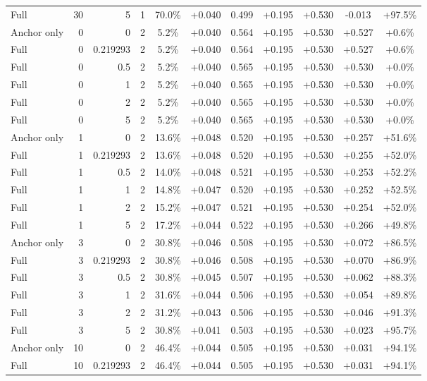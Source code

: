 \begin{table}[htbp]
\begin{tabular}{lrrrccccccc}
Full & 30 & 5 & 1 & 70.0\% & +0.040 & 0.499 & +0.195 & +0.530 & -0.013 & +97.5\% \\
Anchor only & 0 & 0 & 2 & 5.2\% & +0.040 & 0.564 & +0.195 & +0.530 & +0.527 & +0.6\% \\
Full & 0 & 0.219293 & 2 & 5.2\% & +0.040 & 0.564 & +0.195 & +0.530 & +0.527 & +0.6\% \\
Full & 0 & 0.5 & 2 & 5.2\% & +0.040 & 0.565 & +0.195 & +0.530 & +0.530 & +0.0\% \\
Full & 0 & 1 & 2 & 5.2\% & +0.040 & 0.565 & +0.195 & +0.530 & +0.530 & +0.0\% \\
Full & 0 & 2 & 2 & 5.2\% & +0.040 & 0.565 & +0.195 & +0.530 & +0.530 & +0.0\% \\
Full & 0 & 5 & 2 & 5.2\% & +0.040 & 0.565 & +0.195 & +0.530 & +0.530 & +0.0\% \\
Anchor only & 1 & 0 & 2 & 13.6\% & +0.048 & 0.520 & +0.195 & +0.530 & +0.257 & +51.6\% \\
Full & 1 & 0.219293 & 2 & 13.6\% & +0.048 & 0.520 & +0.195 & +0.530 & +0.255 & +52.0\% \\
Full & 1 & 0.5 & 2 & 14.0\% & +0.048 & 0.521 & +0.195 & +0.530 & +0.253 & +52.2\% \\
Full & 1 & 1 & 2 & 14.8\% & +0.047 & 0.520 & +0.195 & +0.530 & +0.252 & +52.5\% \\
Full & 1 & 2 & 2 & 15.2\% & +0.047 & 0.521 & +0.195 & +0.530 & +0.254 & +52.0\% \\
Full & 1 & 5 & 2 & 17.2\% & +0.044 & 0.522 & +0.195 & +0.530 & +0.266 & +49.8\% \\
Anchor only & 3 & 0 & 2 & 30.8\% & +0.046 & 0.508 & +0.195 & +0.530 & +0.072 & +86.5\% \\
Full & 3 & 0.219293 & 2 & 30.8\% & +0.046 & 0.508 & +0.195 & +0.530 & +0.070 & +86.9\% \\
Full & 3 & 0.5 & 2 & 30.8\% & +0.045 & 0.507 & +0.195 & +0.530 & +0.062 & +88.3\% \\
Full & 3 & 1 & 2 & 31.6\% & +0.044 & 0.506 & +0.195 & +0.530 & +0.054 & +89.8\% \\
Full & 3 & 2 & 2 & 31.2\% & +0.043 & 0.506 & +0.195 & +0.530 & +0.046 & +91.3\% \\
Full & 3 & 5 & 2 & 30.8\% & +0.041 & 0.503 & +0.195 & +0.530 & +0.023 & +95.7\% \\
Anchor only & 10 & 0 & 2 & 46.4\% & +0.044 & 0.505 & +0.195 & +0.530 & +0.031 & +94.1\% \\
Full & 10 & 0.219293 & 2 & 46.4\% & +0.044 & 0.505 & +0.195 & +0.530 & +0.031 & +94.1\% \\

\end{tabular}
\end{table}
